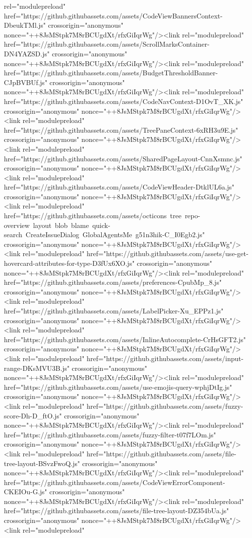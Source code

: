 rel="modulepreload" href="https://github.githubassets.com/assets/CodeViewBannersContext-DbeukTMl.js" crossorigin="anonymous" nonce="++8JsMStpk7M8rBCUgdXt/rfxGiIqrWg"/><link rel="modulepreload" href="https://github.githubassets.com/assets/ScrollMarksContainer-DN4YAZSD.js" crossorigin="anonymous" nonce="++8JsMStpk7M8rBCUgdXt/rfxGiIqrWg"/><link rel="modulepreload" href="https://github.githubassets.com/assets/BudgetThresholdBanner-CJpBVBUf.js" crossorigin="anonymous" nonce="++8JsMStpk7M8rBCUgdXt/rfxGiIqrWg"/><link rel="modulepreload" href="https://github.githubassets.com/assets/CodeNavContext-D1OvT_XK.js" crossorigin="anonymous" nonce="++8JsMStpk7M8rBCUgdXt/rfxGiIqrWg"/><link rel="modulepreload" href="https://github.githubassets.com/assets/TreePaneContext-6xRH3u9E.js" crossorigin="anonymous" nonce="++8JsMStpk7M8rBCUgdXt/rfxGiIqrWg"/><link rel="modulepreload" href="https://github.githubassets.com/assets/SharedPageLayout-CnnXsmnc.js" crossorigin="anonymous" nonce="++8JsMStpk7M8rBCUgdXt/rfxGiIqrWg"/><link rel="modulepreload" href="https://github.githubassets.com/assets/CodeViewHeader-DtklUL6a.js" crossorigin="anonymous" nonce="++8JsMStpk7M8rBCUgdXt/rfxGiIqrWg"/><link rel="modulepreload" href="https://github.githubassets.com/assets/octicons~tree~repo-overview~layout~blob~blame~quick-search~CreateIssueDialog~GlobalAgentsMe~g51n3hik-C_I0Egb2.js" crossorigin="anonymous" nonce="++8JsMStpk7M8rBCUgdXt/rfxGiIqrWg"/><link rel="modulepreload" href="https://github.githubassets.com/assets/use-get-hovercard-attributes-for-type-D3fUx6XO.js" crossorigin="anonymous" nonce="++8JsMStpk7M8rBCUgdXt/rfxGiIqrWg"/><link rel="modulepreload" href="https://github.githubassets.com/assets/preferences-CpubMp_8.js" crossorigin="anonymous" nonce="++8JsMStpk7M8rBCUgdXt/rfxGiIqrWg"/><link rel="modulepreload" href="https://github.githubassets.com/assets/LabelPicker-Xu_EPPz1.js" crossorigin="anonymous" nonce="++8JsMStpk7M8rBCUgdXt/rfxGiIqrWg"/><link rel="modulepreload" href="https://github.githubassets.com/assets/InlineAutocomplete-CrHsGFT2.js" crossorigin="anonymous" nonce="++8JsMStpk7M8rBCUgdXt/rfxGiIqrWg"/><link rel="modulepreload" href="https://github.githubassets.com/assets/input-range-DKsMVU3B.js" crossorigin="anonymous" nonce="++8JsMStpk7M8rBCUgdXt/rfxGiIqrWg"/><link rel="modulepreload" href="https://github.githubassets.com/assets/use-emojis-query-wphjDtIg.js" crossorigin="anonymous" nonce="++8JsMStpk7M8rBCUgdXt/rfxGiIqrWg"/><link rel="modulepreload" href="https://github.githubassets.com/assets/fuzzy-score-Dh-D_ftO.js" crossorigin="anonymous" nonce="++8JsMStpk7M8rBCUgdXt/rfxGiIqrWg"/><link rel="modulepreload" href="https://github.githubassets.com/assets/fuzzy-filter-t07f7LOm.js" crossorigin="anonymous" nonce="++8JsMStpk7M8rBCUgdXt/rfxGiIqrWg"/><link rel="modulepreload" href="https://github.githubassets.com/assets/file-tree-layout-BSvzFwoQ.js" crossorigin="anonymous" nonce="++8JsMStpk7M8rBCUgdXt/rfxGiIqrWg"/><link rel="modulepreload" href="https://github.githubassets.com/assets/CodeViewErrorComponent-CKEIOu-G.js" crossorigin="anonymous" nonce="++8JsMStpk7M8rBCUgdXt/rfxGiIqrWg"/><link rel="modulepreload" href="https://github.githubassets.com/assets/file-tree-layout-DZ354bUa.js" crossorigin="anonymous" nonce="++8JsMStpk7M8rBCUgdXt/rfxGiIqrWg"/><link rel="modulepreload" 